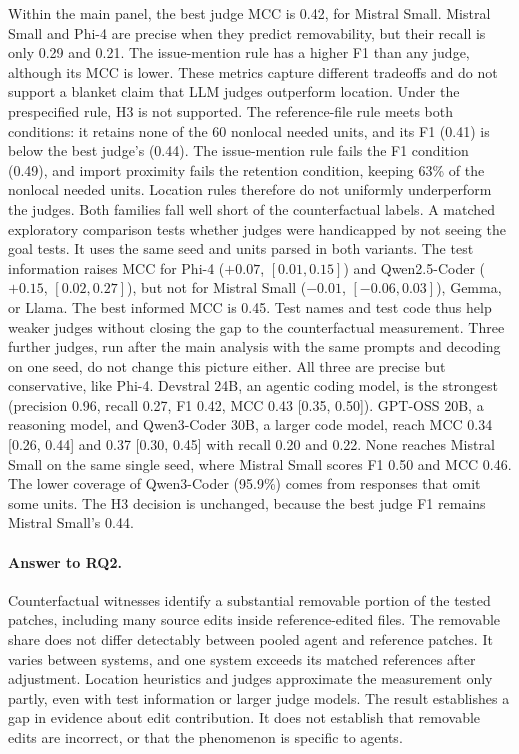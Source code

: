 \documentclass[a4paper,fleqn]{cas-sc}
\begin{document}
Within the main panel, the best judge MCC is 0.42, for Mistral Small. Mistral Small and Phi-4 are precise when they predict removability, but their recall is only 0.29 and 0.21. The issue-mention rule has a higher F1 than any judge, although its MCC is lower. These metrics capture different tradeoffs and do not support a blanket claim that LLM judges outperform location. Under the prespecified rule, H3 is not supported. The reference-file rule meets both conditions: it retains none of the 60 nonlocal needed units, and its F1 (0.41) is below the best judge's (0.44). The issue-mention rule fails the F1 condition (0.49), and import proximity fails the retention condition, keeping 63\% of the nonlocal needed units. Location rules therefore do not uniformly underperform the judges. Both families fall well short of the counterfactual labels. A matched exploratory comparison tests whether judges were handicapped by not seeing the goal tests. It uses the same seed and units parsed in both variants. The test information raises MCC for Phi-4 ($+0.07$, $[0.01, 0.15]$) and Qwen2.5-Coder ($+0.15$, $[0.02, 0.27]$), but not for Mistral Small ($-0.01$, $[-0.06, 0.03]$), Gemma, or Llama. The best informed MCC is 0.45. Test names and test code thus help weaker judges without closing the gap to the counterfactual measurement. Three further judges, run after the main analysis with the same prompts and decoding on one seed, do not change this picture either. All three are precise but conservative, like Phi-4. Devstral 24B, an agentic coding model, is the strongest (precision 0.96, recall 0.27, F1 0.42, MCC 0.43 [0.35, 0.50]). GPT-OSS 20B, a reasoning model, and Qwen3-Coder 30B, a larger code model, reach MCC 0.34 [0.26, 0.44] and 0.37 [0.30, 0.45] with recall 0.20 and 0.22. None reaches Mistral Small on the same single seed, where Mistral Small scores F1 0.50 and MCC 0.46. The lower coverage of Qwen3-Coder (95.9\%) comes from responses that omit some units. The H3 decision is unchanged, because the best judge F1 remains Mistral Small's 0.44.

\paragraph{Answer to RQ2.}
Counterfactual witnesses identify a substantial removable portion of the tested patches, including many source edits inside reference-edited files. The removable share does not differ detectably between pooled agent and reference patches. It varies between systems, and one system exceeds its matched references after adjustment. Location heuristics and judges approximate the measurement only partly, even with test information or larger judge models. The result establishes a gap in evidence about edit contribution. It does not establish that removable edits are incorrect, or that the phenomenon is specific to agents.
\end{document}
